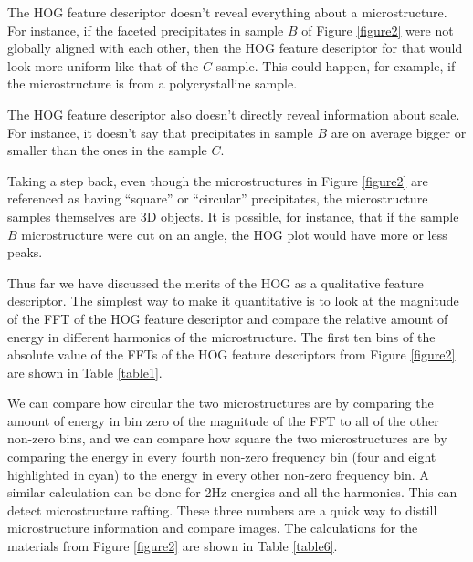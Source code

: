 \documentclass[review]{elsarticle}
\begin{document}
	The HOG feature descriptor doesn't reveal everything about a microstructure. For instance, if the faceted precipitates in sample $B$ of Figure \ref{figure2} were not globally aligned with each other, then the HOG feature descriptor for that would look more uniform like that of the $C$ sample. This could happen, for example, if the microstructure is from a polycrystalline sample.
	
	The HOG feature descriptor also doesn't directly reveal information about scale. For instance, it doesn't say that precipitates in sample $B$ are on average bigger or smaller than the ones in the sample $C$.
	
	Taking a step back, even though the microstructures in Figure \ref{figure2} are referenced as having ``square'' or ``circular'' precipitates, the microstructure samples themselves are 3D objects. It is possible, for instance, that if the sample $B$ microstructure were cut on an angle, the HOG plot would have more or less peaks.

	Thus far we have discussed the merits of the HOG as a qualitative feature descriptor. The simplest way to make it quantitative is to look at the magnitude of the FFT of the HOG feature descriptor and compare the relative amount of energy in different harmonics of the microstructure. The first ten bins of the absolute value of the FFTs of the HOG feature descriptors from Figure \ref{figure2} are shown in Table \ref{table1}.
	
  	We can compare how circular the two microstructures are by comparing the amount of energy in bin zero of the magnitude of the FFT to all of the other non-zero bins, and we can compare how square the two microstructures are by comparing the energy in every fourth non-zero frequency bin (four and eight highlighted in cyan) to the energy in every other non-zero frequency bin. A similar calculation can be done for 2Hz energies and all the harmonics. This can detect microstructure rafting. These three numbers are a quick way to distill microstructure information and compare images. The calculations for the materials from Figure \ref{figure2} are shown in Table \ref{table6}.
\end{document}
